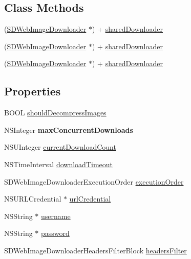 \subsection*{Class Methods}
\begin{DoxyCompactItemize}
\item 
(\mbox{\hyperlink{interface_s_d_web_image_downloader}{S\+D\+Web\+Image\+Downloader}} $\ast$) + \mbox{\hyperlink{interface_s_d_web_image_downloader_a3611251a4eebd50128610c79d48aadca}{shared\+Downloader}}
\item 
(\mbox{\hyperlink{interface_s_d_web_image_downloader}{S\+D\+Web\+Image\+Downloader}} $\ast$) + \mbox{\hyperlink{interface_s_d_web_image_downloader_a3611251a4eebd50128610c79d48aadca}{shared\+Downloader}}
\item 
(\mbox{\hyperlink{interface_s_d_web_image_downloader}{S\+D\+Web\+Image\+Downloader}} $\ast$) + \mbox{\hyperlink{interface_s_d_web_image_downloader_a3611251a4eebd50128610c79d48aadca}{shared\+Downloader}}
\end{DoxyCompactItemize}
\subsection*{Properties}
\begin{DoxyCompactItemize}
\item 
B\+O\+OL \mbox{\hyperlink{interface_s_d_web_image_downloader_ac91a3f91279023164c48bd066abbfbea}{should\+Decompress\+Images}}
\item 
\mbox{\label{interface_s_d_web_image_downloader_a6895c7acffd3bd3769a3c2f0e75e32f6}} 
N\+S\+Integer {\bfseries max\+Concurrent\+Downloads}
\item 
N\+S\+U\+Integer \mbox{\hyperlink{interface_s_d_web_image_downloader_a5fa5ece3c9fbec729d208f9901c6b711}{current\+Download\+Count}}
\item 
N\+S\+Time\+Interval \mbox{\hyperlink{interface_s_d_web_image_downloader_ab8353ea3b82be017001b01ac3577f52f}{download\+Timeout}}
\item 
S\+D\+Web\+Image\+Downloader\+Execution\+Order \mbox{\hyperlink{interface_s_d_web_image_downloader_a4f5cbec407970585eb0c08de1a0319fa}{execution\+Order}}
\item 
N\+S\+U\+R\+L\+Credential $\ast$ \mbox{\hyperlink{interface_s_d_web_image_downloader_adcc405c7347908892553755d566d25a5}{url\+Credential}}
\item 
N\+S\+String $\ast$ \mbox{\hyperlink{interface_s_d_web_image_downloader_a2d5ff61c6369936cafd3a74a936131cd}{username}}
\item 
N\+S\+String $\ast$ \mbox{\hyperlink{interface_s_d_web_image_downloader_a40582f4e02831675fdfc851186bd6d64}{password}}
\item 
S\+D\+Web\+Image\+Downloader\+Headers\+Filter\+Block \mbox{\hyperlink{interface_s_d_web_image_downloader_ae7594a7c9a621aaa6a27fdb72fcbae9b}{headers\+Filter}}
\end{DoxyCompactItemize}


